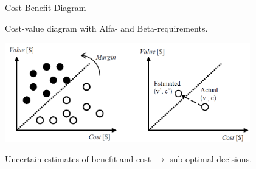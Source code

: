 \begin{Slide}{Cost-Benefit Diagram}

Cost-value diagram with Alfa- and Beta-requirements.
\begin{center}
\includegraphics[width=0.8\textwidth]{../img/cost-benefit-prio}
\end{center}
Uncertain estimates of benefit and cost $\rightarrow$ sub-optimal decisions.
\end{Slide}
